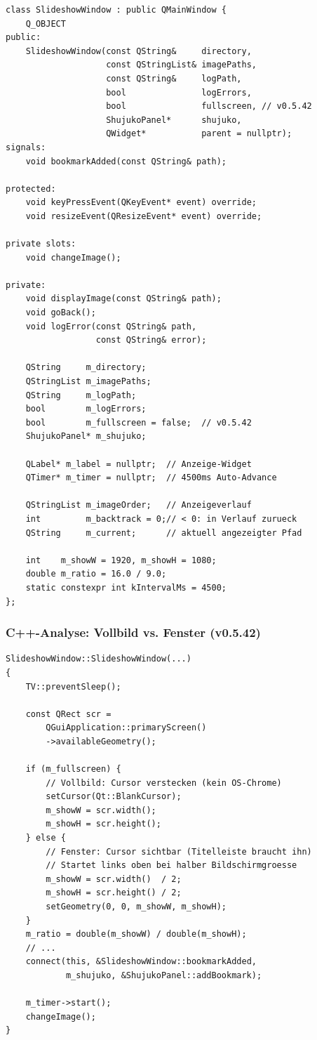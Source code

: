 \begin{lstlisting}[style=header, caption={slideshowwindow.h -- Kern}]
class SlideshowWindow : public QMainWindow {
    Q_OBJECT
public:
    SlideshowWindow(const QString&     directory,
                    const QStringList& imagePaths,
                    const QString&     logPath,
                    bool               logErrors,
                    bool               fullscreen, // v0.5.42
                    ShujukoPanel*      shujuko,
                    QWidget*           parent = nullptr);
signals:
    void bookmarkAdded(const QString& path);

protected:
    void keyPressEvent(QKeyEvent* event) override;
    void resizeEvent(QResizeEvent* event) override;

private slots:
    void changeImage();

private:
    void displayImage(const QString& path);
    void goBack();
    void logError(const QString& path,
                  const QString& error);

    QString     m_directory;
    QStringList m_imagePaths;
    QString     m_logPath;
    bool        m_logErrors;
    bool        m_fullscreen = false;  // v0.5.42
    ShujukoPanel* m_shujuko;

    QLabel* m_label = nullptr;  // Anzeige-Widget
    QTimer* m_timer = nullptr;  // 4500ms Auto-Advance

    QStringList m_imageOrder;   // Anzeigeverlauf
    int         m_backtrack = 0;// < 0: in Verlauf zurueck
    QString     m_current;      // aktuell angezeigter Pfad

    int    m_showW = 1920, m_showH = 1080;
    double m_ratio = 16.0 / 9.0;
    static constexpr int kIntervalMs = 4500;
};
\end{lstlisting}

\subsubsection{C++-Analyse: Vollbild vs. Fenster (v0.5.42)}

\begin{lstlisting}[caption={Konstruktor: Vollbild- vs. Fensterlogik}]
SlideshowWindow::SlideshowWindow(...)
{
    TV::preventSleep();

    const QRect scr =
        QGuiApplication::primaryScreen()
        ->availableGeometry();

    if (m_fullscreen) {
        // Vollbild: Cursor verstecken (kein OS-Chrome)
        setCursor(Qt::BlankCursor);
        m_showW = scr.width();
        m_showH = scr.height();
    } else {
        // Fenster: Cursor sichtbar (Titelleiste braucht ihn)
        // Startet links oben bei halber Bildschirmgroesse
        m_showW = scr.width()  / 2;
        m_showH = scr.height() / 2;
        setGeometry(0, 0, m_showW, m_showH);
    }
    m_ratio = double(m_showW) / double(m_showH);
    // ...
    connect(this, &SlideshowWindow::bookmarkAdded,
            m_shujuko, &ShujukoPanel::addBookmark);

    m_timer->start();
    changeImage();
}
\end{lstlisting}

